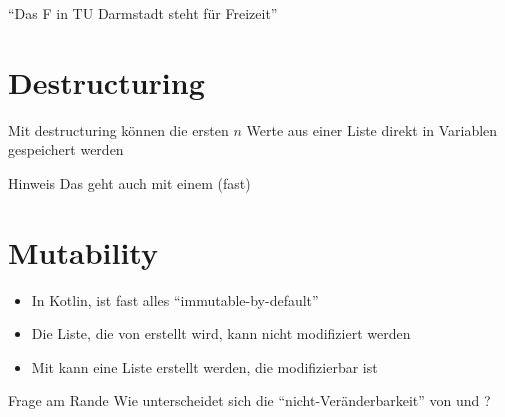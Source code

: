 \begin{frame}
    \slidehead
    \pause
    \vspace{2em}
    \centering
    \enquote{Das F in TU Darmstadt steht für Freizeit}
\end{frame}

\livecoding

\section{Destructuring}\label{sec:destructuring}
\begin{frame}
    \slidehead
    Mit destructuring können die ersten $n$ Werte aus einer Liste direkt in Variablen gespeichert werden
    \pause
    \pause
    \begin{block}{Hinweis}
        Das geht auch mit einem  (fast)
    \end{block}
\end{frame}

\begin{frame}
    \slidehead
\end{frame}

\livecoding

\section{Mutability}
\begin{frame}
    \slidehead
    \begin{itemize}[<+->]
        \item In Kotlin, ist fast alles \enquote{immutable-by-default}
        \item Die Liste, die von  erstellt wird, kann nicht modifiziert werden
        \item Mit  kann eine Liste erstellt werden, die modifizierbar ist
    \end{itemize}
    \begin{block}{Frage am Rande}
        Wie unterscheidet sich die \enquote{nicht-Veränderbarkeit} von  und ?
    \end{block}
\end{frame}

